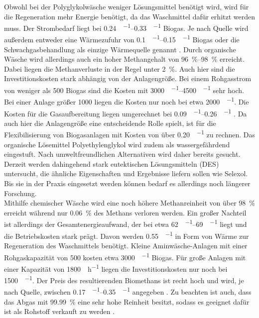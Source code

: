 Obwohl bei der Polyglykolwäsche weniger Lösungsmittel benötigt wird, wird für die Regeneration mehr Energie benötigt, da das Waschmittel dafür erhitzt werden muss. Der Strombedarf liegt bei \SIrange{0,24}{0,33}{\kwh\per\normvol} Biogas. Je nach Quelle wird außerdem entweder eine Wärmezufuhr von \SIrange{0,1}{0,15}{\kwh\per\normvol} Biogas oder die Schwachgasbehandlung als einzige Wärmequelle genannt \parencite{Emp18}. Durch organische Wäsche wird allerdings auch ein hoher Methangehalt von \SIrange{96}{98}{\percent} erreicht. Dabei liegen die Methanverluste in der Regel unter \SI{2}{\percent}. Auch hier sind die Investitionskosten stark abhängig von der Anlagengröße. Bei einem Rohgasstrom von weniger als \SI{500}{\normvolh} Biogas sind die Kosten mit \SIrange{3000}{4500}{\sieuro\per\normvolh} sehr hoch. Bei einer Anlage größer \SI{1000}{\normvolh} liegen die Kosten nur noch bei etwa \SI{2000}{\sieuro\per\normvolh}. Die Kosten für die Gasaufbereitung liegen umgerechnet bei \SIrange{0,09}{0,26}{\sieuro\per\normvol} \parencite{FNR14}. Da auch hier die Anlagengröße eine entscheidende Rolle spielt, ist für die Flexibilisierung von Biogasanlagen mit Kosten von über \SI{0,20}{\sieuro\per\normvol} zu rechnen. Das organische Lösemittel Polyethylenglykol wird zudem als wassergefährdend eingestuft. Nach umweltfreundlichen Alternativen wird daher bereits gesucht. Derzeit werden dahingehend stark eutektischen Lösungsmitteln (DES) untersucht, die ähnliche Eigenschaften und Ergebnisse liefern sollen wie Selexol\textsuperscript{\textregistered}. Bis sie in der Praxis eingesetzt werden können bedarf es allerdings noch längerer Forschung. \parencite{FNR14} \parencite{Struk20} \\

Mithilfe chemischer Wäsche wird eine noch höhere Methanreinheit von über \SI{98}{\percent} erreicht\parencite{KGKK2019} während nur \SI{0,06}{\percent} des Methans verloren werden. Ein großer Nachteil ist allerdings der Gesamtenergieaufwand, der bei etwa \SIrange{62}{69}{\kwh\per\normvol} liegt und die Betriebskosten stark prägt. Davon werden \SI{0,55}{\kwh\per\normvol} in Form von Wärme zur Regeneration des Waschmittels benötigt. Kleine Aminwäsche-Anlagen mit einer Rohgaskapazität von \SI{500}{\normvolh} kosten etwa \SI{3000}{\sieuro\per\normvolh} Biogas. Für große Anlagen mit einer Kapazität von \SI{1800}{\normvol\per\hour} liegen die Investitionskosten nur noch bei \SI{1500}{\sieuro\per\normvolh}. Der Preis des resultierenden Biomethans ist recht hoch und wird, je nach Quelle, zwischen \SIrange{0,17}{0,35}{\sieuro\per\normvol} angegeben \parencite{Coll17} \parencite{Emp18}. Zu beachten ist auch, dass das Abgas mit \SI{99,99}{\percent} eine sehr hohe  Reinheit besitzt, sodass es geeignet dafür ist als Rohstoff verkauft zu werden \parencite{DSW15}. \parencite{BHPT13} \\

